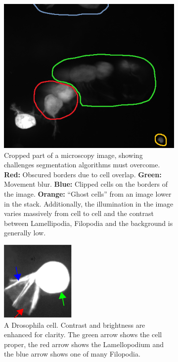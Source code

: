 \begin {figure}[!ht]	
	\centering
	\begin {subfigure}[t]{0.52\linewidth}
		\includegraphics[scale=0.60]{img/fig_problems.png}

		\caption*{Cropped part of a microscopy image, showing challenges segmentation algorithms must overcome. \textbf{Red:} Obscured borders due to cell overlap. \textbf{Green:} Movement blur. \textbf{Blue:} Clipped cells on the borders of the image. \textbf{Orange:} ``Ghost cells'' from an image lower in the stack. Additionally, the illumination in the image varies massively from cell to cell and the contrast between Lamellipodia, Filopodia and the background is generally low.}
	\end {subfigure}
	\hspace{1cm}
	\begin {subfigure}[t]{0.35\linewidth}
		\includegraphics[scale=1.0]{img/fig_cell_example.png}

		\caption*{A Drosophila cell. Contrast and brightness are enhanced for clarity. The green arrow shows the cell proper, the red arrow shows the Lamellopodium and the blue arrow shows one of many Filopodia.}
	\end {subfigure}

	\caption[]{}
	\label{fig:cell_example}
\end {figure}

